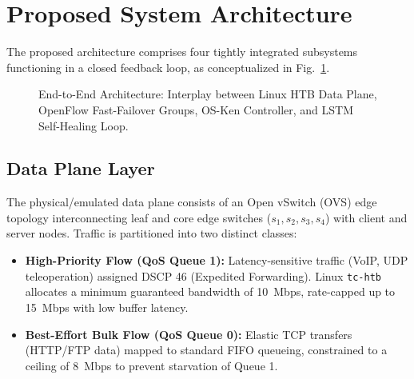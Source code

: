 \documentclass[conference]{IEEEtran}
\begin{document}
\section{Proposed System Architecture}
The proposed architecture comprises four tightly integrated subsystems functioning in a closed feedback loop, as conceptualized in Fig.~\ref{fig:architecture}.

\begin{figure}[htbp]
\centerline{}
\caption{End-to-End Architecture: Interplay between Linux HTB Data Plane, OpenFlow Fast-Failover Groups, OS-Ken Controller, and LSTM Self-Healing Loop.}
\label{fig:architecture}
\end{figure}

\subsection{Data Plane Layer}
The physical/emulated data plane consists of an Open vSwitch (OVS) edge topology interconnecting leaf and core edge switches ($s_1, s_2, s_3, s_4$) with client and server nodes. Traffic is partitioned into two distinct classes:
\begin{itemize}
    \item \textbf{High-Priority Flow (QoS Queue 1):} Latency-sensitive traffic (VoIP, UDP teleoperation) assigned DSCP 46 (Expedited Forwarding). Linux \texttt{tc-htb} allocates a minimum guaranteed bandwidth of 10~Mbps, rate-capped up to 15~Mbps with low buffer latency.
    \item \textbf{Best-Effort Bulk Flow (QoS Queue 0):} Elastic TCP transfers (HTTP/FTP data) mapped to standard FIFO queueing, constrained to a ceiling of 8~Mbps to prevent starvation of Queue 1.
\end{itemize}
\end{document}
